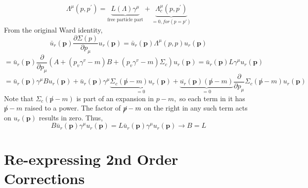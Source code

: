  $$\Lambda^{\mu}\left(p, p^{\prime}\right)=\underbrace{L(\Lambda) \gamma^{\mu}}_{\text{free particle part}}+\underbrace{\Lambda_{c}^{\mu}\left(p, p^{\prime}\right)}_{=0,for(p=p')}$$
 From the original Ward identity,
 $$\bar{u}_{r}(\mathbf{p}) \frac{\partial \Sigma(p)}{\partial p_{\mu}} u_{r}(\mathbf{p})=\bar{u}_{r}(\mathbf{p}) \Lambda^{\mu}(p, p) u_{r}(\mathbf{p})$$
 $$=\bar{u}_{r}(\mathbf{p}) \frac{\partial}{\partial p_{\mu}}\left(A+\left(p_{v} \gamma^{v}-m\right) B+\left(p_{v} \gamma^{v}-m\right) \Sigma_{c}\right) u_{r}(\mathbf{p})=\bar{u}_{r}(\mathbf{p}) L \gamma^{\mu} u_{r}(\mathbf{p})$$
 $$=\bar{u}_{r}(\mathbf{p}) \gamma^{\mu} B u_{r}(\mathbf{p})+\bar{u}_{r}(\mathbf{p}) \gamma^{\mu} \underbrace{\Sigma_{c}\left(\not p-m\right) u_{r}(\mathbf{p})}_{=0}+\underbrace{\overline{u_{r}}(\mathbf{p})(\not p-m)}_{=0} \frac{\partial}{\partial p_{\mu}} \Sigma_{c}(\not p-m) u_{r}(\mathbf{p})
 $$
 Note that $\Sigma_{c}(\not p-m)$ is part of an expansion in $p-m,$ so each term in it has $\not p-m$ raised to a power. The factor of $\cancel{p}-m$ on the right in any such term acts on $u_r(\mathbf{p})$ results in zero. Thus,
 \begin{equation}B \bar{u}_{r}(\mathbf{p}) \gamma^{\mu} u_{r}(\mathbf{p})=L \bar{u}_{r}(\mathbf{p}) \gamma^{\mu} u_{r}(\mathbf{p}) \rightarrow B=L\end{equation}
 
 \section{Re-expressing 2nd Order Corrections}
